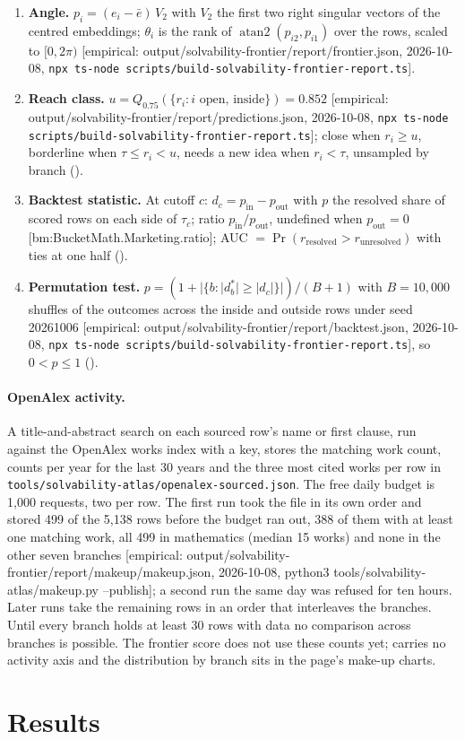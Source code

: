 \documentclass[11pt]{article}
\newcommand{\emp}[1]{\textcolor{bucketgray}{\footnotesize [empirical: #1]}}
\newcommand{\bm}[1]{\textcolor{bucketgray}{\footnotesize [bm:#1]}}
\newcommand{\cmd}{\texttt{npx ts-node scripts/build-solvability-frontier-report.ts}}
\newcommand{\bt}{\emp{output/solvability-frontier/report/backtest.json, 2026-10-08, \cmd}}
\newcommand{\fr}{\emp{output/solvability-frontier/report/frontier.json, 2026-10-08, \cmd}}
\newcommand{\pr}{\emp{output/solvability-frontier/report/predictions.json, 2026-10-08, \cmd}}
\newcommand{\mk}{\emp{output/solvability-frontier/report/makeup/makeup.json, 2026-10-08, python3 tools/solvability-atlas/makeup.py --publish}}
\begin{document}
\begin{enumerate}
  \item \textbf{Angle.} $p_i = (e_i - \bar e)\,V_2$ with $V_2$ the first two right singular vectors of the centred embeddings; $\theta_i$ is the rank of $\operatorname{atan2}(p_{i2}, p_{i1})$ over the rows, scaled to $[0, 2\pi)$ \fr.
  \item \textbf{Reach class.} $u = Q_{0.75}(\{ r_i : i \text{ open, inside} \}) = 0.852$ \pr; close when $r_i \geq u$, borderline when $\tau \leq r_i < u$, needs a new idea when $r_i < \tau$, unsampled by branch ().
  \item \textbf{Backtest statistic.} At cutoff $c$: $d_c = p_{\mathrm{in}} - p_{\mathrm{out}}$ with $p$ the resolved share of scored rows on each side of $\tau_c$; ratio $p_{\mathrm{in}}/p_{\mathrm{out}}$, undefined when $p_{\mathrm{out}} = 0$ \bm{BucketMath.Marketing.ratio}; AUC $= \Pr(r_{\text{resolved}} > r_{\text{unresolved}})$ with ties at one half ().
  \item \textbf{Permutation test.} $p = (1 + |\{ b : |d^*_b| \geq |d_c| \}|)/(B+1)$ with $B = 10{,}000$ shuffles of the outcomes across the inside and outside rows under seed 20261006 \bt, so $0 < p \leq 1$ ().
\end{enumerate}

\paragraph{OpenAlex activity.}
A title-and-abstract search on each sourced row's name or first clause, run against the OpenAlex works index with a key, stores the matching work count, counts per year for the last 30 years and the three most cited works per row in \texttt{tools/solvability-atlas/openalex-sourced.json}. The free daily budget is 1,000 requests, two per row. The first run took the file in its own order and stored 499 of the 5,138 rows before the budget ran out, 388 of them with at least one matching work, all 499 in mathematics (median 15 works) and none in the other seven branches \mk; a second run the same day was refused for ten hours. Later runs take the remaining rows in an order that interleaves the branches. Until every branch holds at least 30 rows with data no comparison across branches is possible. The frontier score does not use these counts yet;  carries no activity axis and the distribution by branch sits in the page's make-up charts.

\section{Results}
\label{sec:results}
\end{document}
